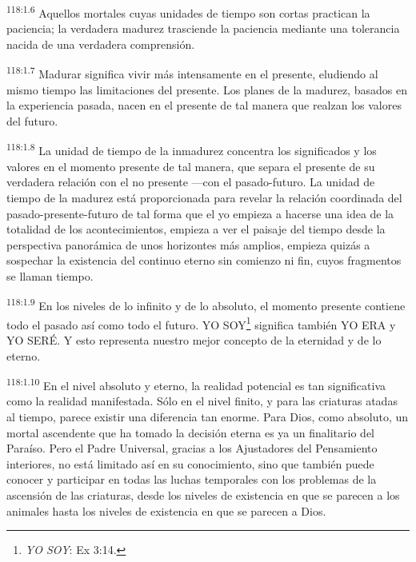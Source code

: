 \documentclass[twoside, 11pt]{book}
\begin{document}
\par
\textsuperscript{118:1.6} Aquellos mortales cuyas unidades de tiempo son cortas practican la paciencia; la verdadera madurez trasciende la paciencia mediante una tolerancia nacida de una verdadera comprensión.

\par
\textsuperscript{118:1.7} Madurar significa vivir más intensamente en el presente, eludiendo al mismo tiempo las limitaciones del presente. Los planes de la madurez, basados en la experiencia pasada, nacen en el presente de tal manera que realzan los valores del futuro.

\par
\textsuperscript{118:1.8} La unidad de tiempo de la inmadurez concentra los significados y los valores en el momento presente de tal manera, que separa el presente de su verdadera relación con el no presente ---con el pasado-futuro. La unidad de tiempo de la madurez está proporcionada para revelar la relación coordinada del pasado-presente-futuro de tal forma que el yo empieza a hacerse una idea de la totalidad de los acontecimientos, empieza a ver el paisaje del tiempo desde la perspectiva panorámica de unos horizontes más amplios, empieza quizás a sospechar la existencia del continuo eterno sin comienzo ni fin, cuyos fragmentos se llaman tiempo.

\par
\textsuperscript{118:1.9} En los niveles de lo infinito y de lo absoluto, el momento presente contiene todo el pasado así como todo el futuro. YO SOY\footnote{\textit{YO SOY}: Ex 3:14.} significa también YO ERA y YO SERÉ. Y esto representa nuestro mejor concepto de la eternidad y de lo eterno.

\par
\textsuperscript{118:1.10} En el nivel absoluto y eterno, la realidad potencial es tan significativa como la realidad manifestada. Sólo en el nivel finito, y para las criaturas atadas al tiempo, parece existir una diferencia tan enorme. Para Dios, como absoluto, un mortal ascendente que ha tomado la decisión eterna es ya un finalitario del Paraíso. Pero el Padre Universal, gracias a los Ajustadores del Pensamiento interiores, no está limitado así en su conocimiento, sino que también puede conocer y participar en todas las luchas temporales con los problemas de la ascensión de las criaturas, desde los niveles de existencia en que se parecen a los animales hasta los niveles de existencia en que se parecen a Dios.
\end{document}
